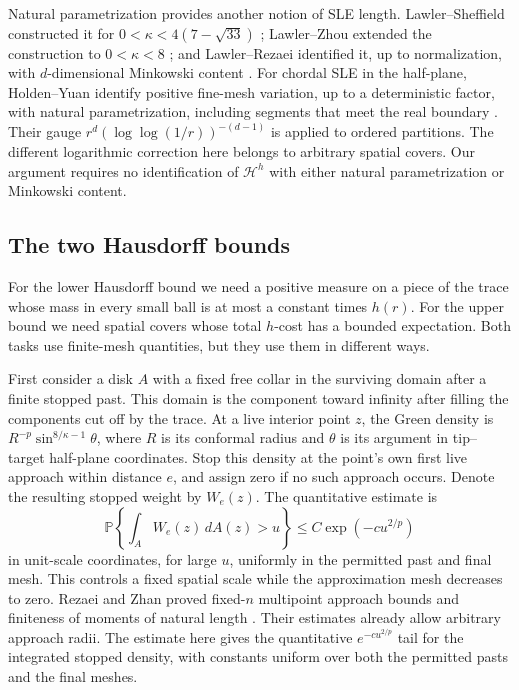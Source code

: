 \documentclass[11pt]{article}
\theoremstyle{definition}
\theoremstyle{remark}
\numberwithin{equation}{section}
\begin{document}
Natural parametrization provides another notion of SLE length.
Lawler--Sheffield constructed it for
$0<\kappa<4(7-\sqrt{33})$ \cite[Theorem~3.1]{lawlersheffield2011};
Lawler--Zhou extended the construction to $0<\kappa<8$
\cite[Theorem~1]{lawlerzhou2013}; and Lawler--Rezaei identified it,
up to normalization, with $d$-dimensional Minkowski content
\cite[Theorem~1.1 and p.~5]{lawlerrezaei2015}.
For chordal SLE in the half-plane, Holden--Yuan identify positive
fine-mesh variation, up to a deterministic factor, with natural
parametrization, including segments that meet the real boundary
\cite[Theorems~1.7--1.8]{holdenyuan2026}.
Their gauge $r^d(\log\log(1/r))^{-(d-1)}$ is applied to ordered
partitions. The different logarithmic correction here belongs to
arbitrary spatial covers. Our argument requires no identification
of $\mathcal H^h$ with either natural parametrization or Minkowski
content.

\subsection{The two Hausdorff bounds}

For the lower Hausdorff bound we need a positive measure on a piece
of the trace whose mass in every small ball is at most a constant
times $h(r)$. For the upper bound we need spatial covers whose total
$h$-cost has a bounded expectation. Both tasks use finite-mesh
quantities, but they use them in different ways.

First consider a disk $A$ with a fixed free collar in the surviving
domain after a finite stopped past. This domain is the component
toward infinity after filling the components cut off by the trace.
At a live interior point $z$, the Green density is
$R^{-p}\sin^{8/\kappa-1}\theta$, where $R$ is its conformal radius
and $\theta$ is its argument in tip--target half-plane coordinates.
Stop this density at the point's own first live approach within
distance $e$, and assign zero if no such approach occurs. Denote
the resulting stopped weight by $W_e(z)$. The quantitative estimate is
\[
 \mathbb P\left\{\int_AW_e(z)\,dA(z)>u\right\}
        \le C\exp(-cu^{2/p})
\]
in unit-scale coordinates, for large $u$, uniformly in the permitted
past and final mesh. This controls a fixed spatial scale while the
approximation mesh decreases to zero. Rezaei and Zhan proved
fixed-$n$ multipoint approach bounds and finiteness of moments of natural
length \cite[Theorems~1.1--1.2]{rezaeizhan2017}. Their estimates already
allow arbitrary approach radii. The estimate here gives the quantitative
$e^{-cu^{2/p}}$ tail for the integrated stopped density, with constants
uniform over both the permitted pasts and the final meshes.
\end{document}
